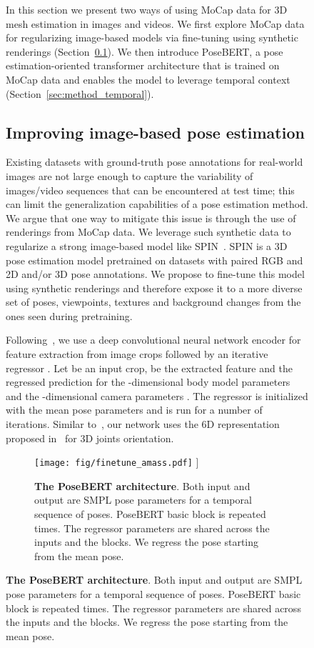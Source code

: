 \documentclass[10pt,twocolumn,letterpaper]{article}
\newcommand{\smpltransformer}{PoseBERT\xspace}
\newcommand{\posebert}{\smpltransformer}
\begin{document}
\begin{figure}
In this section we present two ways of using MoCap data for 3D mesh estimation in images and videos.
We first explore MoCap data for regularizing image-based models via fine-tuning using synthetic renderings (Section~\ref{sec:method_fine-tuning}). 
We then introduce \posebert, a pose estimation-oriented transformer architecture that is trained on MoCap data and enables the model to leverage temporal context (Section~\ref{sec:method_temporal}).


\subsection{Improving image-based pose estimation}
\label{sec:method_fine-tuning}



Existing datasets with ground-truth pose annotations for real-world images are not large enough to capture the variability of images/video sequences that can be encountered at test time; this can limit the generalization capabilities of a pose estimation method. We argue that one way to mitigate this issue is through the use of renderings from MoCap data. We leverage such synthetic data to regularize a strong image-based model like SPIN~\cite{spin}. SPIN is a 3D pose estimation model pretrained on datasets with paired RGB and 2D and/or 3D pose annotations. We propose to fine-tune this model using synthetic renderings and therefore expose it to a more diverse set of poses, viewpoints, textures and background changes from the ones seen during pretraining.  



Following~\cite{hmr,spin}, we use a deep convolutional neural network encoder  for feature extraction from image crops followed by an iterative regressor . Let  be an input crop,  be the extracted feature and 
the regressed prediction for the -dimensional body model parameters  and the -dimensional camera parameters . The regressor  is  initialized with the mean pose parameters  and is run for a number of  iterations. Similar to~\cite{spin}, our network uses the 6D representation proposed in~\cite{rotation} for 3D joints orientation.


\begin{figure}[t]
\centering
\texttt{[image: fig/finetune\_amass.pdf]} \-0.3cm]
\caption{\label{fig:transformer}\textbf{The \posebert architecture}. Both input and output are SMPL pose parameters for a temporal sequence of  poses. \smpltransformer basic block is repeated  times. The regressor parameters are shared across the  inputs and the  blocks. We regress the pose starting from the mean pose.
}
\vspace{-0.5cm}
\end{figure}




\end{figure}
\end{document}
